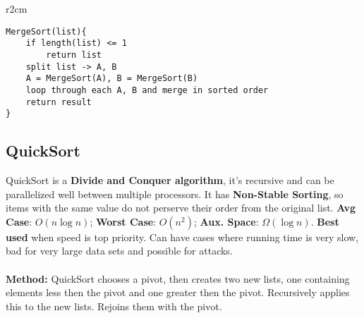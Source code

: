\documentclass{article}
\begin{document}
\begin{wrapfigure}{r}{2cm}
\end{wrapfigure}
\begin{lstlisting}[style=pseudo]
MergeSort(list){
	if length(list) <= 1
		return list
	split list -> A, B
	A = MergeSort(A), B = MergeSort(B)
	loop through each A, B and merge in sorted order
	return result
}
\end{lstlisting}
\vspace{10 mm}


\subsection{QuickSort}
QuickSort is a {\bf Divide and Conquer algorithm}, it's recursive and can be parallelized well between multiple processors. It has {\bf Non-Stable Sorting}, so items with the same value do not perserve their order from the original list. {\bf Avg Case}: $O(n \log n)$; {\bf Worst Case}: $O(n^2)$; {\bf Aux. Space}: $\Omega(\log n)$. {\bf Best used} when speed is top priority. Can have cases where running time is very slow, bad for very large data sets and possible for attacks.
\\ \\
{\bf Method:} QuickSort chooses a pivot, then creates two new lists, one containing elements less then the pivot and one greater then the pivot. Recursively applies this to the new lists. Rejoins them with the pivot.
\end{document}
